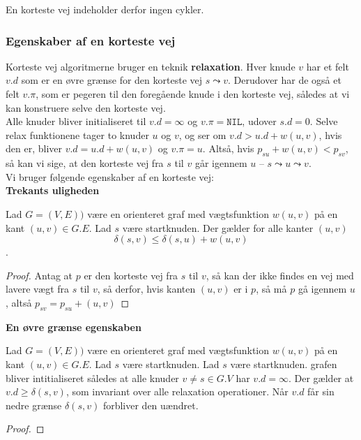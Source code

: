 En korteste vej indeholder derfor ingen cykler.

\subsubsection{Egenskaber af en korteste vej}
Korteste vej algoritmerne bruger en teknik \textbf{relaxation}. Hver knude $v$ har et felt $v.d$ som er en øvre grænse for den korteste vej  $s \leadsto v$. Derudover har de også et felt $v.\pi$, som er pegeren til den foregående knude i den korteste vej, således at vi kan konstruere selve den korteste vej.\\

Alle knuder bliver initialiseret til $v.d = \infty$ og $v.\pi=\texttt{NIL}$, udover $s.d=0$. Selve relax funktionene tager to knuder $u$ og $v$, og ser om $v.d > u.d + w(u,v)$, hvis den er, bliver $v.d = u.d + w(u,v)$ og $v.\pi = u$. Altså, hvis $p_{su} + w(u,v) < p_{sv}$, så kan vi sige, at den korteste vej fra $s$ til $v$ går igennem $u$ -- $s \leadsto u \leadsto v$.\\

Vi bruger følgende egenskaber af en korteste vej:\\

\textbf{Trekants uligheden}
\begin{lemma}
  Lad $G = (V,E))$ være en orienteret graf med vægtsfunktion $w(u,v)$ på en kant $(u,v) \in G.E$. Lad $s$ være startknuden. Der gælder for alle kanter $(u,v)$
  $$\delta(s,v) \leq \delta(s,u) + w(u,v)$$.
\end{lemma}

\begin{proof}
  Antag at $p$ er den korteste vej fra $s$ til $v$, så kan der ikke findes en vej med lavere vægt fra $s$ til $v$, så derfor, hvis kanten $(u,v)$ er i $p$, så må $p$ gå igennem $u$, altså
  $p_{sv} = p_{su} + (u,v)$
\end{proof}


\textbf{En øvre grænse egenskaben}
\begin{lemma}
  Lad $G = (V,E))$ være en orienteret graf med vægtsfunktion $w(u,v)$ på en kant $(u,v) \in G.E$. Lad $s$ være startknuden. Lad $s$ være startknuden. grafen bliver intitialiseret således at alle knuder $v \neq s \in G.V$ har $v.d = \infty$. Der gælder at $v.d \geq \delta(s,v)$, som invariant over alle relaxation operationer. Når $v.d$ får sin nedre grænse $\delta(s,v)$ forbliver den uændret. 
\end{lemma}

\begin{proof}
\end{proof}


